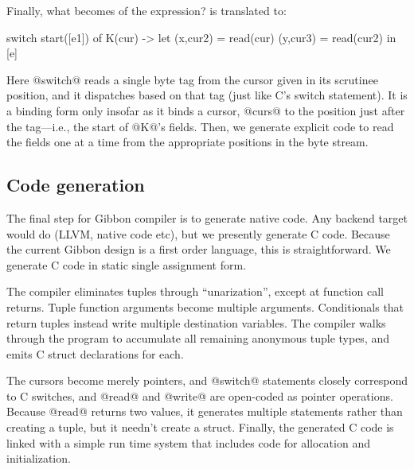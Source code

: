 \documentclass[a4paper,english]{lipics-v2016}
\newcommand{\treelang}{Gibbon\xspace} %
\newcommand{\treecomp}{Gibbon compiler{}}
\begin{document}
Finally, what becomes of the  expression?   is
translated to:

\begin{code}
  switch start([e1]) of
    K(cur) -> let (x,cur2) = read(cur)
                  (y,cur3) = read(cur2)
              in [e]
\end{code}

Here @switch@ reads a single byte tag from the cursor given in its scrutinee
position, and it dispatches based on that tag (just like C's switch statement).
It is a binding form only insofar as it binds a cursor, @curs@ to the position
just after the tag---i.e., the start of @K@'s fields.  Then, we generate
explicit code to read the fields one at a time from the appropriate positions in
the byte stream.

\subsection{Code generation}

The final step for \treecomp{} is to generate native code.  Any backend target
would do (LLVM, native code etc), but we presently generate C code.
%
Because the current \treelang design is a {first order} language,
this is straightforward.  We generate C code in static single assignment form.

The compiler eliminates tuples through ``unarization'', except at function call
returns.  Tuple function arguments become multiple arguments.  Conditionals that
return tuples instead write multiple destination variables.  The compiler walks
through the program to accumulate all remaining anonymous tuple types, and emits
C struct declarations for each.

The cursors become merely  pointers, and 
%
@switch@ statements closely correspond to C switches, and @read@ and @write@ are
open-coded as pointer operations.  Because @read@ returns two values, it
generates multiple statements rather than creating a tuple, but it needn't
create a struct.
%
%
Finally, the generated C code is linked with a simple run time system that
includes code for allocation and initialization.
\end{document}
